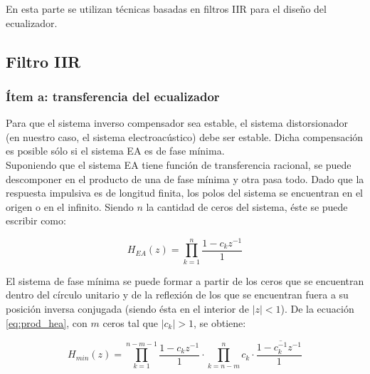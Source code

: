 En esta parte se utilizan técnicas basadas en filtros IIR para el diseño del ecualizador.
{\color{red}{MMM medio figaza ésto pareciera}}

\subsection{Filtro IIR}




\subsubsection{Ítem a: transferencia del ecualizador} \label{sec:221a}

	Para que el sistema inverso compensador sea estable, el sistema distorsionador (en nuestro caso, el sistema electroacústico) debe ser estable. Dicha compensación es posible sólo si el sistema EA es de fase mínima.\\

	Suponiendo que el sistema EA tiene función de transferencia racional, se puede descomponer en el producto de una de fase mínima y otra pasa todo. Dado que la respuesta impulsiva es de longitud finita, los polos del sistema se encuentran en el origen o en el infinito. Siendo $n$ la cantidad de ceros del sistema, éste se puede escribir como: 
		
		\begin{equation}
			H_{EA}(z) = \prod^n_{k=1} \frac{1-c_k z^{-1}}{1} 
			\label{eq:prod_hea}
		\end{equation}
	
		El sistema de fase mínima se puede formar a partir de los ceros que se encuentran dentro del círculo unitario y de la reflexión de los que se encuentran fuera a su posición inversa conjugada (siendo ésta en el interior de $|z|<1$). De la ecuación \eqref{eq:prod_hea}, con $m$ ceros tal que $|c_k|>1$, se obtiene:

		\begin{equation*}
			H_{min}(z) = \prod^{n-m-1}_{k=1} \frac{1-c_k z^{-1}}{1} \cdot \prod^{n}_{k=n-m} c_{k} \cdot \frac{1-\overline{c_k^{-1}} z^{-1}}{1}
		\end{equation*}


